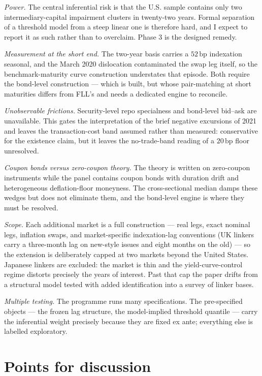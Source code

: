 \documentclass[11pt]{article}
\newcommand{\bps}{\,\text{bp}}
\begin{document}
\emph{Power.} The central inferential risk is that the U.S. sample contains only two intermediary-capital impairment clusters in twenty-two years. Formal separation of a threshold model from a steep linear one is therefore hard, and I expect to report it as such rather than to overclaim. Phase 3 is the designed remedy.

\emph{Measurement at the short end.} The two-year basis carries a $52\bps$ indexation seasonal, and the March 2020 dislocation contaminated the swap leg itself, so the benchmark-maturity curve construction understates that episode. Both require the bond-level construction --- which is built, but whose pair-matching at short maturities differs from FLL's and needs a dedicated engine to reconcile.

\emph{Unobservable frictions.} Security-level repo specialness and bond-level bid--ask are unavailable. This gates the interpretation of the brief negative excursions of 2021 and leaves the transaction-cost band assumed rather than measured: conservative for the existence claim, but it leaves the no-trade-band reading of a $20\bps$ floor unresolved.

\emph{Coupon bonds versus zero-coupon theory.} The theory is written on zero-coupon instruments while the panel contains coupon bonds with duration drift and heterogeneous deflation-floor moneyness. The cross-sectional median damps these wedges but does not eliminate them, and the bond-level engine is where they must be resolved.

\emph{Scope.} Each additional market is a full construction --- real legs, exact nominal legs, inflation swaps, and market-specific indexation-lag conventions (UK linkers carry a three-month lag on new-style issues and eight months on the old) --- so the extension is deliberately capped at two markets beyond the United States. Japanese linkers are excluded: the market is thin and the yield-curve-control regime distorts precisely the years of interest. Past that cap the paper drifts from a structural model tested with added identification into a survey of linker bases.

\emph{Multiple testing.} The programme runs many specifications. The pre-specified objects --- the frozen lag structure, the model-implied threshold quantile --- carry the inferential weight precisely because they are fixed ex ante; everything else is labelled exploratory.

\section{Points for discussion}\label{sec:disc}
\end{document}
